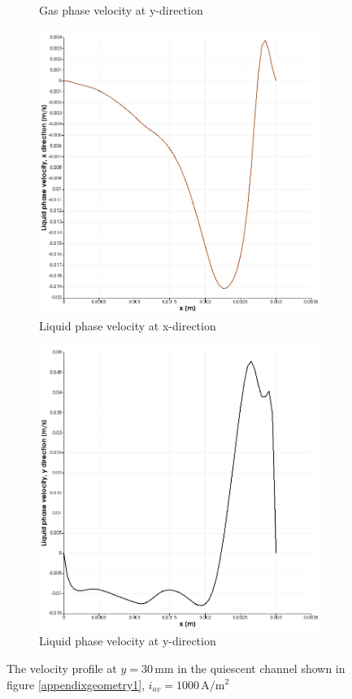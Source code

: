 \begin{figure}
\begin{subfigure}{.43\textwidth}
  \caption{Gas phase velocity at y-direction}
\end{subfigure}
\begin{subfigure}{.43\textwidth}
  \centering
  \includegraphics[width=1\linewidth]{liquidphasevelocityxdirection.png}
  \caption{Liquid phase velocity at x-direction}
\end{subfigure}%
\begin{subfigure}{.43\textwidth}
  \centering
  \includegraphics[width=1\linewidth]{liquidphasevelocityydirection.png}
  \caption{Liquid phase velocity at y-direction}
\end{subfigure}
\caption{The velocity profile at $y = 30 \, \mathrm{mm}$ in the quiescent channel shown in figure \ref{appendixgeometry1}, $i_{av}=1000 \, \mathrm{A/m^2}$}
\label{pseudovelocity}
\end{figure}